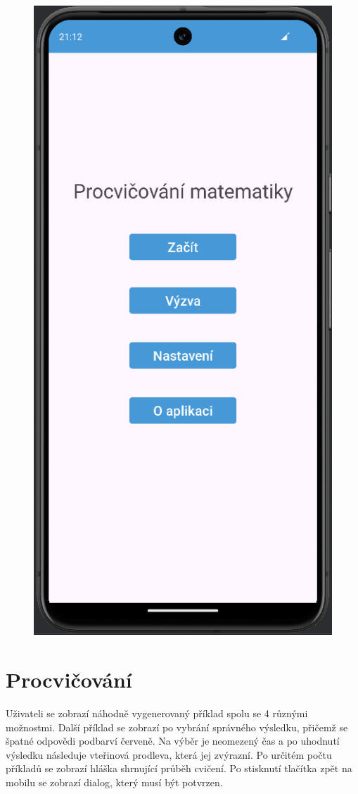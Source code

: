 \documentclass[12pt]{report}
\begin{document}
	\begin{figure}[ht]
		\centering
		\includegraphics[height=0.9\textwidth]{img/menu}
		\label{fig:menu}
	\end{figure}
	
	\newpage
	\section{Procvičování}
	Uživateli se zobrazí náhodně vygenerovaný příklad spolu se 4 různými možnostmi. Další příklad se zobrazí po vybrání správného výsledku, přičemž se špatné odpovědi podbarví červeně. Na výběr je neomezený čas a po uhodnutí výsledku následuje vteřinová prodleva, která jej zvýrazní. Po určitém počtu příkladů se zobrazí hláška shrnující průběh cvičení. Po stisknutí tlačítka zpět na mobilu se zobrazí dialog, který musí být potvrzen.
	
\end{document}

